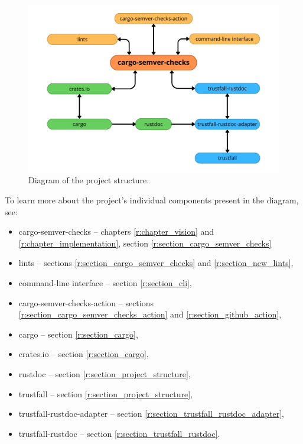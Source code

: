 \documentclass[licencjacka,en]{pracamgr}
\begin{document}
\begin{figure}[h]
	\centering
	\includegraphics[width=\linewidth]{project-structure-diagram.png}
	\caption{Diagram of the project structure.}
\end{figure}


To learn more about the project's individual components present in the diagram, see:
\begin{itemize}
	\item cargo-semver-checks -- chapters \ref{r:chapter_vision} and \ref{r:chapter_implementation},
		section \ref{r:section_cargo_semver_checks}
	\item lints -- sections \ref{r:section_cargo_semver_checks} and \ref{r:section_new_lints},
	\item command-line interface -- section \ref{r:section_cli},
	\item cargo-semver-checks-action -- sections \ref{r:section_cargo_semver_checks_action}
		and \ref{r:section_github_action},
	\item cargo -- section \ref{r:section_cargo},
	\item crates.io -- section \ref{r:section_cargo},
	\item rustdoc -- section \ref{r:section_project_structure},
	\item trustfall -- section \ref{r:section_project_structure},
	\item trustfall-rustdoc-adapter -- section \ref{r:section_trustfall_rustdoc_adapter},
	\item trustfall-rustdoc -- section \ref{r:section_trustfall_rustdoc}.
\end{itemize}
\end{document}
